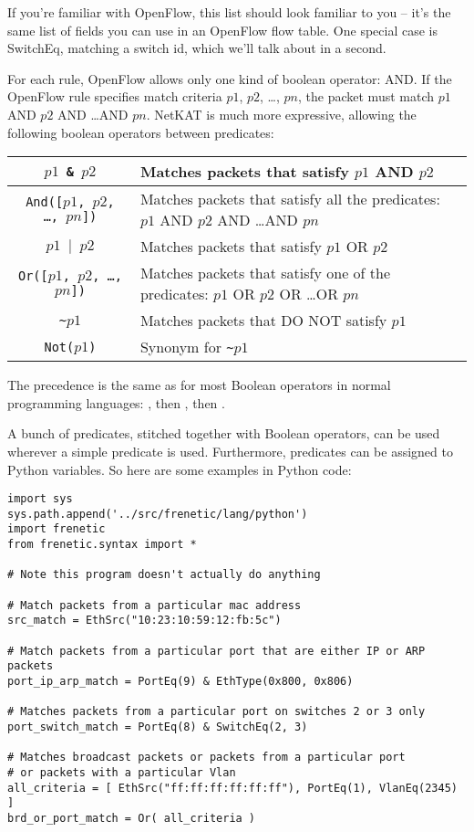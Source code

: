 \bigskip
If you're familiar with OpenFlow, this list should look familiar to you -- it's the same list of fields you can 
use in an OpenFlow flow table.
One special case is SwitchEq, matching a switch id, which we'll talk about in a second.  

For each rule, OpenFlow allows only one kind of boolean operator: AND.  
If the OpenFlow rule specifies match criteria $p1$, $p2$, \ldots, $pn$, the packet must match $p1$ AND $p2$
AND \ldots AND $pn$.  
NetKAT is much more expressive, allowing the following boolean operators between predicates:

\bigskip
\begin{tabularx}{6in}{|c|X|}
\hline\hline
\texttt{$p1$ \& $p2$} & Matches packets that satisfy $p1$ AND $p2$
\\ \hline  
\texttt{And([$p1$, $p2$, \ldots, $pn$])} & 
Matches packets that satisfy all the predicates: $p1$ AND $p2$ AND \ldots AND $pn$
\\ \hline  
\texttt{$p1$ $\vert$ $p2$} & Matches packets that satisfy $p1$ OR $p2$
\\ \hline  
\texttt{Or([$p1$, $p2$, \ldots, $pn$])} & 
Matches packets that satisfy one of the predicates: $p1$ OR $p2$ OR \ldots OR $pn$
\\ \hline  
\texttt{\textasciitilde $p1$} & Matches packets that DO NOT satisfy $p1$
\\ \hline  
\texttt{Not($p1$)} & Synonym for \texttt{\textasciitilde $p1$}
\\ \hline\hline
\end{tabularx}

\bigskip

The precedence is the same as for most Boolean operators in normal programming languages: 
, then , then .  

A bunch of predicates, stitched together with Boolean operators, can be used wherever a simple predicate is used.
Furthermore, predicates can be assigned to Python variables.
So here are some examples in Python code:

\begin{verbatim}
import sys
sys.path.append('../src/frenetic/lang/python')
import frenetic
from frenetic.syntax import *

# Note this program doesn't actually do anything

# Match packets from a particular mac address
src_match = EthSrc("10:23:10:59:12:fb:5c")

# Match packets from a particular port that are either IP or ARP packets
port_ip_arp_match = PortEq(9) & EthType(0x800, 0x806)

# Matches packets from a particular port on switches 2 or 3 only
port_switch_match = PortEq(8) & SwitchEq(2, 3)

# Matches broadcast packets or packets from a particular port 
# or packets with a particular Vlan
all_criteria = [ EthSrc("ff:ff:ff:ff:ff:ff"), PortEq(1), VlanEq(2345) ] 
brd_or_port_match = Or( all_criteria ) 

\end{verbatim}

